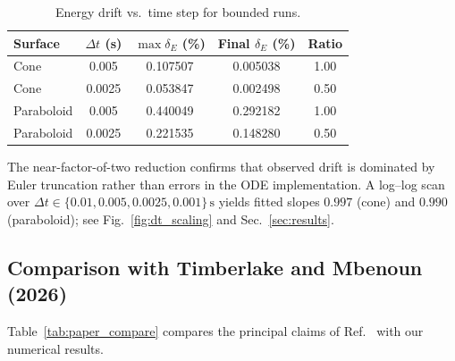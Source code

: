 \documentclass[11pt,letterpaper]{article}
\begin{document}
\begin{table}[htbp]
    \centering
    \caption{Energy drift vs.\ time step for bounded runs.}
    \label{tab:dt_halving}
    \begin{tabular}{l
        S[table-format=1.4]
        S[table-format=2.6]
        S[table-format=2.6]
        S[table-format=1.2]}
        \toprule
        {Surface} & {$\Delta t$ (s)} & {$\max\delta_E$ (\%)} & {Final $\delta_E$ (\%)} & {Ratio} \\
        \midrule
        Cone & 0.005 & 0.107507 & 0.005038 & 1.00 \\
        Cone & 0.0025 & 0.053847 & 0.002498 & 0.50 \\
        Paraboloid & 0.005 & 0.440049 & 0.292182 & 1.00 \\
        Paraboloid & 0.0025 & 0.221535 & 0.148280 & 0.50 \\
        \bottomrule
    \end{tabular}
\end{table}

The near-factor-of-two reduction confirms that observed drift is dominated by Euler truncation rather than errors in the ODE implementation. A log--log scan over $\Delta t\in\{0.01,0.005,0.0025,0.001\}\,\mathrm{s}$ yields fitted slopes $0.997$ (cone) and $0.990$ (paraboloid); see Fig.~\ref{fig:dt_scaling} and Sec.~\ref{sec:results}.

\subsection{Comparison with Timberlake and Mbenoun (2026)}
\label{sec:paper_compare}

Table~\ref{tab:paper_compare} compares the principal claims of Ref.~\cite{ajp2026} with our numerical results.
\end{document}
